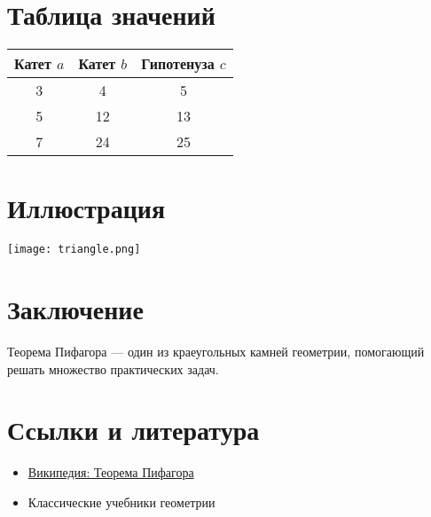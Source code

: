 \documentclass{article}
\begin{document}
\section{Таблица значений}

\begin{center}
\begin{tabular}{|c|c|c|}
\hline
Катет $a$ & Катет $b$ & Гипотенуза $c$ \\
\hline
3 & 4 & 5 \\
5 & 12 & 13 \\
7 & 24 & 25 \\
\hline
\end{tabular}
\end{center}

\section{Иллюстрация}

\begin{center}
\texttt{[image: triangle.png]}
\end{center}

\section{Заключение}
Теорема Пифагора — один из краеугольных камней геометрии, помогающий решать множество практических задач.

\section{Ссылки и литература}
\begin{itemize}
  \item \href{https://ru.wikipedia.org/wiki/Теорема_Пифагора}{Википедия: Теорема Пифагора}
  \item Классические учебники геометрии
\end{itemize}
\end{document}
